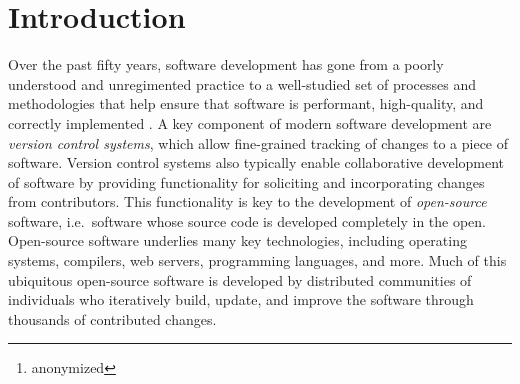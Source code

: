 \documentclass[nohyperref]{article}
\theoremstyle{plain}
\theoremstyle{definition}
\theoremstyle{remark}
\begin{document}
\printAffiliationsAndNotice{\icmlEqualContribution} %

\begin{abstract}
Currently, most machine learning models are trained by a centralized team and are rarely updated.
In contrast, open-source software development involves the iterative development of a shared artifact through distributed collaboration of many individuals using version control systems.
In the interest of enabling collaborative and continual improvement of machine learning models, we introduce Git-Theta, a version control system for machine learning models.
Git-Theta is an extension to Git, the most widely used version control software, thereby allowing fine-grained tracking of changes to a model's parameters alongside code and other artifacts.
Existing version control systems for model checkpoints treat the model as a blob of data and therefore do not support cheaply communicable updates or merging, which are fundamentally important operations for receiving and incorporating changes from contributors.
Git-Theta supports various existing approaches for parameter-efficient training and model merging and provides functionality for displaying meaningful information about thedifference between two versions of a model.
In addition, Git-Theta includes a plugin system that enables downstream users to easily add support for new functionality.
In this paper, we introduce Git-Theta's key features and design choices.
We also include an example use-case of Git-Theta where a pre-trained model is adapted to new tasks through parameter-efficient fine-tuning, merging, and manual removal of parameters.
We publicly release Git-Theta in hopes of kickstarting a new era of collaborative model development.\footnote{anonymized}
\end{abstract}

\section{Introduction}

Over the past fifty years, software development has gone from a poorly understood and unregimented practice to a well-studied set of processes and methodologies that help ensure that software is performant, high-quality, and correctly implemented \citep{brooks1975mythical}.
A key component of modern software development are \textit{version control systems}, which allow fine-grained tracking of changes to a piece of software.
Version control systems also typically enable collaborative development of software by providing functionality for soliciting and incorporating changes from contributors.
This functionality is key to the development of \textit{open-source} software, i.e.\ software whose source code is developed completely in the open.
Open-source software underlies many key technologies, including operating systems, compilers, web servers, programming languages, and more.
Much of this ubiquitous open-source software is developed by distributed communities of individuals who iteratively build, update, and improve the software through thousands of contributed changes.
\end{document}
